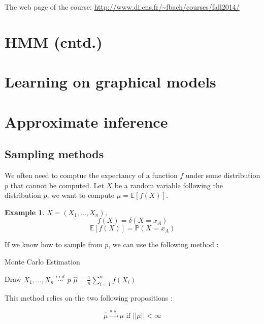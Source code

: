 \documentclass[12pt]{report}
\newcommand{\esp}{\mathbb{E}}
\newcommand{\p}{\mathbb{P}}
\newtheorem{example}{Example}[section]
\begin{document}
\maketitle

The web page of the course: \url{http://www.di.ens.fr/~fbach/courses/fall2014/}

\section{HMM (cntd.)}
\section{Learning on graphical models}
\section{Approximate inference}
\subsection{Sampling methods}

We often need to comptue the expectancy of a function $f$ under some distribution $p$ that cannot be computed. Let $X$ be a random variable following the distribution $p$, we want to compute $\mu = \esp[f(X)]$.

\begin{example}
$ X = (X_1, ..., X_n)$,
$$f(X) = \delta(X = x_A)$$
$$\esp[f(X)] = \p(X=x_A)$$
\end{example}

If we know how to sample from $p$, we can use the following method :

\FloatBarrier
\begin{algorithm}
\caption{Monte Carlo Estimation}\label{RS}
\begin{algorithmic}[1]
\State Draw $X_1, ..., X_n~\overset{i.i.d.}{\sim}~p$
\State $\hat{\mu} = \frac{1}{n}\sum_{i=1}^n f(X_i)$
\end{algorithmic}
\end{algorithm}
\FloatBarrier

This method relies on the two following propositions :

\begin{proposition}
\[
\hat{\mu} \overset{a.s.}{\longrightarrow} \mu \text{ if } ||\mu|| < \infty
\]
\end{proposition}
\end{document}
